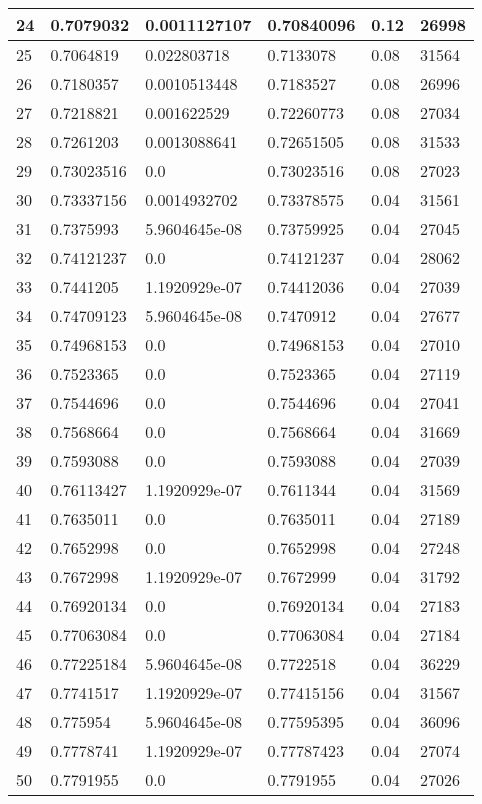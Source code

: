 \begin{longtable}{|l|l|l|l|l|l|}
24 & 0.7079032 & 0.0011127107 & 0.70840096 & 0.12 & 26998 \\ \hline 
25 & 0.7064819 & 0.022803718 & 0.7133078 & 0.08 & 31564 \\ \hline 
26 & 0.7180357 & 0.0010513448 & 0.7183527 & 0.08 & 26996 \\ \hline 
27 & 0.7218821 & 0.001622529 & 0.72260773 & 0.08 & 27034 \\ \hline 
28 & 0.7261203 & 0.0013088641 & 0.72651505 & 0.08 & 31533 \\ \hline 
29 & 0.73023516 & 0.0 & 0.73023516 & 0.08 & 27023 \\ \hline 
30 & 0.73337156 & 0.0014932702 & 0.73378575 & 0.04 & 31561 \\ \hline 
31 & 0.7375993 & 5.9604645e-08 & 0.73759925 & 0.04 & 27045 \\ \hline 
32 & 0.74121237 & 0.0 & 0.74121237 & 0.04 & 28062 \\ \hline 
33 & 0.7441205 & 1.1920929e-07 & 0.74412036 & 0.04 & 27039 \\ \hline 
34 & 0.74709123 & 5.9604645e-08 & 0.7470912 & 0.04 & 27677 \\ \hline 
35 & 0.74968153 & 0.0 & 0.74968153 & 0.04 & 27010 \\ \hline 
36 & 0.7523365 & 0.0 & 0.7523365 & 0.04 & 27119 \\ \hline 
37 & 0.7544696 & 0.0 & 0.7544696 & 0.04 & 27041 \\ \hline 
38 & 0.7568664 & 0.0 & 0.7568664 & 0.04 & 31669 \\ \hline 
39 & 0.7593088 & 0.0 & 0.7593088 & 0.04 & 27039 \\ \hline 
40 & 0.76113427 & 1.1920929e-07 & 0.7611344 & 0.04 & 31569 \\ \hline 
41 & 0.7635011 & 0.0 & 0.7635011 & 0.04 & 27189 \\ \hline 
42 & 0.7652998 & 0.0 & 0.7652998 & 0.04 & 27248 \\ \hline 
43 & 0.7672998 & 1.1920929e-07 & 0.7672999 & 0.04 & 31792 \\ \hline 
44 & 0.76920134 & 0.0 & 0.76920134 & 0.04 & 27183 \\ \hline 
45 & 0.77063084 & 0.0 & 0.77063084 & 0.04 & 27184 \\ \hline 
46 & 0.77225184 & 5.9604645e-08 & 0.7722518 & 0.04 & 36229 \\ \hline 
47 & 0.7741517 & 1.1920929e-07 & 0.77415156 & 0.04 & 31567 \\ \hline 
48 & 0.775954 & 5.9604645e-08 & 0.77595395 & 0.04 & 36096 \\ \hline 
49 & 0.7778741 & 1.1920929e-07 & 0.77787423 & 0.04 & 27074 \\ \hline 
50 & 0.7791955 & 0.0 & 0.7791955 & 0.04 & 27026 \\ \hline 
\end{longtable}